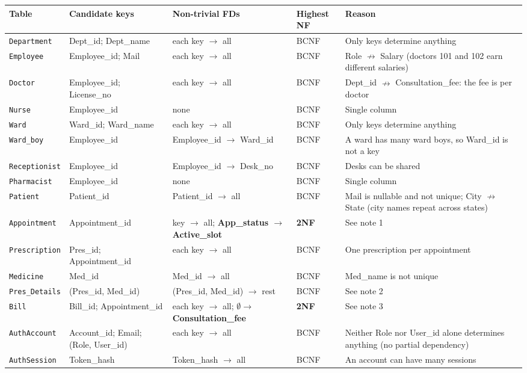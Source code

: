 \documentclass[11pt,a4paper]{article}
\newcommand{\code}[1]{\texttt{#1}}
\begin{document}
\begin{center}
\footnotesize
\begin{tabularx}{\textwidth}{>{\raggedright\arraybackslash}p{2.1cm} >{\raggedright\arraybackslash}p{2.9cm} >{\raggedright\arraybackslash}p{3.3cm} l L}
\toprule
\textbf{Table} & \textbf{Candidate keys} & \textbf{Non-trivial FDs} & \textbf{Highest NF} & \textbf{Reason} \\
\midrule
\code{Department}   & Dept\_id; Dept\_name & each key $\rightarrow$ all & BCNF & Only keys determine anything \\
\code{Employee}     & Employee\_id; Mail & each key $\rightarrow$ all & BCNF & Role $\nrightarrow$ Salary (doctors 101 and 102 earn different salaries) \\
\code{Doctor}       & Employee\_id; License\_no & each key $\rightarrow$ all & BCNF & Dept\_id $\nrightarrow$ Consultation\_fee: the fee is per doctor \\
\code{Nurse}        & Employee\_id & none & BCNF & Single column \\
\code{Ward}         & Ward\_id; Ward\_name & each key $\rightarrow$ all & BCNF & Only keys determine anything \\
\code{Ward\_boy}    & Employee\_id & Employee\_id $\rightarrow$ Ward\_id & BCNF & A ward has many ward boys, so Ward\_id is not a key \\
\code{Receptionist} & Employee\_id & Employee\_id $\rightarrow$ Desk\_no & BCNF & Desks can be shared \\
\code{Pharmacist}   & Employee\_id & none & BCNF & Single column \\
\code{Patient}      & Patient\_id & Patient\_id $\rightarrow$ all & BCNF & Mail is nullable and not unique; City $\nrightarrow$ State (city names repeat across states) \\
\code{Appointment}  & Appointment\_id & key $\rightarrow$ all; \textbf{App\_status $\rightarrow$ Active\_slot} & \textbf{2NF} & See note 1 \\
\code{Prescription} & Pres\_id; Appointment\_id & each key $\rightarrow$ all & BCNF & One prescription per appointment \\
\code{Medicine}     & Med\_id & Med\_id $\rightarrow$ all & BCNF & Med\_name is not unique \\
\code{Pres\_Details} & (Pres\_id, Med\_id) & (Pres\_id, Med\_id) $\rightarrow$ rest & BCNF & See note 2 \\
\code{Bill}         & Bill\_id; Appointment\_id & each key $\rightarrow$ all; \textbf{$\emptyset \rightarrow$ Consultation\_fee} & \textbf{2NF} & See note 3 \\
\code{AuthAccount}  & Account\_id; Email; (Role, User\_id) & each key $\rightarrow$ all & BCNF & Neither Role nor User\_id alone determines anything (no partial dependency) \\
\code{AuthSession}  & Token\_hash & Token\_hash $\rightarrow$ all & BCNF & An account can have many sessions \\
\bottomrule
\end{tabularx}
\end{center}
\end{document}
